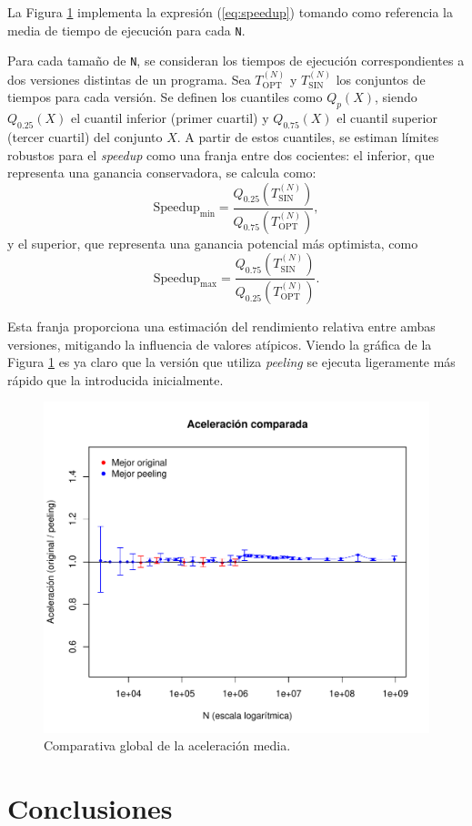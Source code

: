 \documentclass[11pt,a4paper,twoside]{article}
\theoremstyle{definition}
\begin{document}
	La Figura \ref{graf:speedup} implementa la expresión (\ref{eq:speedup}) tomando como referencia la media de tiempo de ejecución para cada \texttt{N}.
	
	Para cada tamaño de \texttt{N}, se consideran los tiempos de ejecución correspondientes a dos versiones distintas de un programa. Sea \( T_{\mathrm{OPT}}^{(N)} \) y \( T_{\mathrm{SIN}}^{(N)} \) los conjuntos de tiempos para cada versión. Se definen los cuantiles como \( Q_p(X) \), siendo \( Q_{0.25}(X) \) el cuantil inferior (primer cuartil) y \( Q_{0.75}(X) \) el cuantil superior (tercer cuartil) del conjunto \( X \). A partir de estos cuantiles, se estiman límites robustos para el \textit{speedup} como una franja entre dos cocientes: el inferior, que representa una ganancia conservadora, se calcula como:
	\begin{equation}\label{q1}
		\text{Speedup}_{\mathrm{min}} = \frac{Q_{0.25}(T_{\mathrm{SIN}}^{(N)})}{Q_{0.75}(T_{\mathrm{OPT}}^{(N)})},
	\end{equation}
	y el superior, que representa una ganancia potencial más optimista, como
	\begin{equation} \label{q2}
		\text{Speedup}_{\mathrm{max}} = \frac{Q_{0.75}(T_{\mathrm{SIN}}^{(N)})}{Q_{0.25}(T_{\mathrm{OPT}}^{(N)})}.
	\end{equation}
	
	Esta franja proporciona una estimación del rendimiento relativa entre ambas versiones, mitigando la influencia de valores atípicos.
	Viendo la gráfica de la Figura \ref{graf:speedup} es ya claro que la versión que utiliza \textit{peeling} se ejecuta ligeramente más rápido que la introducida inicialmente.
	
	\begin{figure} [H] \centering
		\includegraphics[width=.8\textwidth]{../graficas/DIA_speedup.pdf}
		\caption{Comparativa global de la aceleración media.}
		\label{graf:speedup}
	\end{figure}
	
	
	\section{Conclusiones}


\printbibliography
	
	
	
\end{document}

